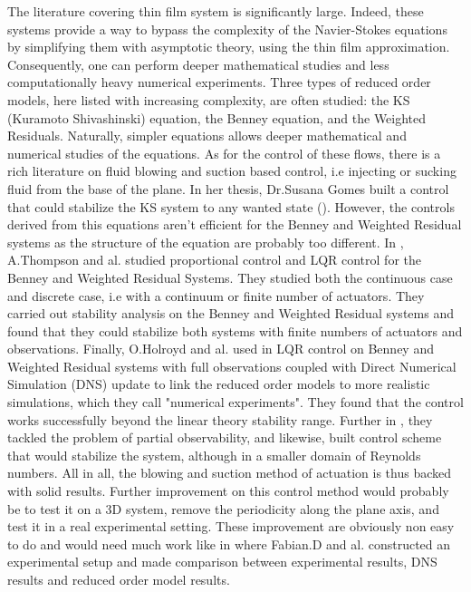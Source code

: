 \documentclass[12pt]{article}
\begin{document}
The literature covering thin film system is significantly large. Indeed, these systems provide a way to bypass the complexity 
of the Navier-Stokes equations by simplifying them with asymptotic theory, using the thin film approximation. Consequently, 
one can perform deeper mathematical studies and less computationally heavy numerical experiments. Three types of reduced order 
models, here listed with increasing complexity, are often studied: the KS (Kuramoto Shivashinski) equation, the Benney equation,
 and the Weighted Residuals. Naturally, simpler equations allows deeper mathematical and numerical studies of the equations. As 
 for the control of these flows, there is a rich literature on fluid blowing and suction based control, i.e injecting or sucking 
 fluid from the base of the plane. In her thesis, Dr.Susana Gomes built a control that could stabilize the KS system to any 
 wanted state (\cite{Susana_thesis}). However, the controls derived from this equations aren't efficient for the Benney and 
 Weighted Residual systems as the structure of the equation are probably too different. In \cite{Thompson_2016_prop_ctrl}, A.Thompson 
 and al. studied proportional control and LQR control for the Benney and Weighted Residual Systems. They studied both the continuous 
 case and discrete case, i.e with a continuum or finite number of actuators. They carried out stability analysis on the Benney and
  Weighted Residual systems and found that they could stabilize both systems with finite numbers of actuators and observations. 
  Finally, O.Holroyd and al. used in \cite{holroyd2023linearquadraticregulationcontrol} LQR control on Benney and Weighted Residual 
  systems with full observations coupled with Direct Numerical Simulation (DNS) update to link the reduced order models to more 
  realistic simulations, which they call "numerical experiments". They found that the control works successfully beyond the linear
   theory stability range. Further in \cite{holroyd2024stabilisationfallingliquidfilms}, they tackled the problem of partial observability,
    and likewise, built control scheme that would stabilize the system, although in a smaller domain of Reynolds numbers. All in all, the
blowing and suction method of actuation is thus backed with solid results. Further improvement on this control method would probably 
be to test it on a 3D system, remove the periodicity along the plane axis, and test it in a real experimental setting. These improvement 
are obviously non easy to do and would need much work like in \cite{Experimental_DNS_Reduced_order_modelling_paper} where Fabian.D and al. 
constructed an experimental setup and made comparison between experimental results, DNS results and reduced order model results. 
\\
\end{document}

